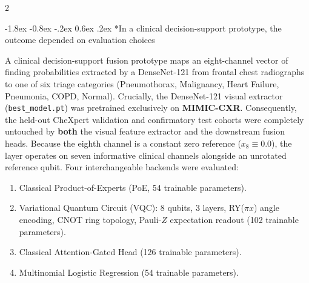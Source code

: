 \documentclass[10pt,a4paper,twoside]{article}
\makeatletter
\renewcommand{\subsection}{\@startsection{subsection}{2}{\z@}%
  {-1.8ex \@plus -0.8ex \@minus -.2ex}%
  {0.6ex \@plus.2ex}%
  {\normalfont\normalsize\sffamily\bfseries\color{naturedark}}}
\makeatother
\begin{document}
\begin{multicols}{2}

\subsection*{In a clinical decision-support prototype, the outcome depended on evaluation choices}

A clinical decision-support fusion prototype maps an eight-channel vector of finding probabilities extracted by a DenseNet-121 from frontal chest radiographs to one of six triage categories (Pneumothorax, Malignancy, Heart Failure, Pneumonia, COPD, Normal). Crucially, the DenseNet-121 visual extractor (\texttt{best\_model.pt}) was pretrained exclusively on \textbf{MIMIC-CXR}. Consequently, the held-out CheXpert validation and confirmatory test cohorts were completely untouched by \textbf{both} the visual feature extractor and the downstream fusion heads. Because the eighth channel is a constant zero reference ($x_8 \equiv 0.0$), the layer operates on seven informative clinical channels alongside an unrotated reference qubit. Four interchangeable backends were evaluated:
\begin{enumerate}
  \setlength{\itemsep}{1pt}
  \item Classical Product-of-Experts (PoE, 54 trainable parameters).
  \item Variational Quantum Circuit (VQC): 8 qubits, 3 layers, RY($\pi x$) angle encoding, CNOT ring topology, Pauli-$Z$ expectation readout (102 trainable parameters).
  \item Classical Attention-Gated Head (126 trainable parameters).
  \item Multinomial Logistic Regression (54 trainable parameters).
\end{enumerate}


\end{multicols}
\end{document}
